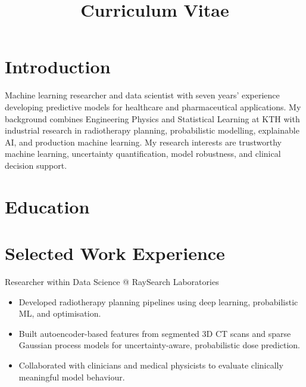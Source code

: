 \documentclass[11pt,a4paper]{moderncv}
\title{Curriculum Vitae}
\begin{document}
\makecvtitle

\section*{Introduction}
Machine learning researcher and data scientist with seven years' experience developing predictive models for healthcare and pharmaceutical applications. My background combines Engineering Physics and Statistical Learning at KTH with industrial research in radiotherapy planning, probabilistic modelling, explainable AI, and production machine learning. My research interests are trustworthy machine learning, uncertainty quantification, model robustness, and clinical decision support.

\section{Education}




\section{Selected Work Experience}

\large{Researcher within Data Science @ RaySearch Laboratories}
\normalsize
\begin{itemize}
\item Developed radiotherapy planning pipelines using deep learning, probabilistic ML, and optimisation. 
\item Built autoencoder-based features from segmented 3D CT scans and sparse Gaussian process models for uncertainty-aware, probabilistic dose prediction.
\item Collaborated with clinicians and medical physicists to evaluate clinically meaningful model behaviour.
\end{itemize}
\end{document}
